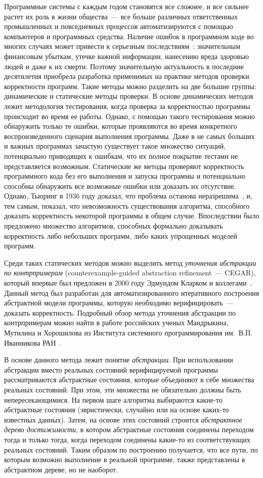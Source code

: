 Программные системы с каждым годом становятся все сложнее, и все сильнее растет их роль в жизни общества~--- все больше различных ответственных промышленных и повседневных процессов автоматизируются с помощью компьютеров и программных средства.
Наличие ошибок в программном коде во многих случаях может привести к серьезным последствиям~\cite{DBLP:journals/ieeesp/ZhivichC09}: значительным финансовым убыткам, утечке важной информации, нанесению вреда здоровью людей и даже к их смерти.
Поэтому значительную актуальность в последние десятилетия приобрела разработка применимых на практике методов проверки корректности программ.
Такие методы можно разделить на две большие группы: динамические и статические методы проверки.
В основе динамических методов лежит методология тестирования, когда проверка за корректностью программы происходит во время ее работы.
Однако, с помощью такого тестирования можно обнаружить только те ошибки, которые проявляются во время конкретного воспроизведенного сценария выполнения программы.
Даже в не самых больших и важных программах зачастую существует такое множество ситуаций, потенциально приводящих к ошибкам, что их полное покрытие тестами не представляется возможным.
Статические же методы проверяют корректность программного кода без его выполнения и запуска программы и потенциально способны обнаружить все возможные ошибки или доказать их отсутствие.
Однако, Тьюринг в 1936 году доказал, что проблема останова неразрешима~\cite{turing1936computable}, и, тем самым, показал, что невозможность существования алгоритма, способного доказать корректность некоторой программы в общем случае.
Впоследствии было предложено множество алгоритмов, способных формально доказывать корректность либо небольших программ, либо каких упрощенных моделей программ.

Среди таких статических методов можно выделить метод \emph{уточнения абстракции по контрпримерам} (counterexample-guided abstraction refinement~--- CEGAR), который впервые был предложен в 2000 году Эдмундом Кларком и коллегами~\cite{DBLP:conf/cav/ClarkeGJLV00}.
Данный метод был разработан для автоматизированного итеративного построения абстрактной модели программы, которую необходимо верифицировать~--- доказать корректность.
Подробный обзор метода уточнения абстракции по контрпримерам можно найти в работе российских ученых Мандрыкина, Мутилина и Хорошилова из Института системного программирования им.~В.П. Иванникова РАН~\cite{мандрыкин2013введение}.

В основе данного метода лежит понятие \emph{абстракции}.
При использовании абстракции вместо реальных состояний верифицируемой программы рассматриваются абстрактные состояния, которые объединяют в себе множества реальных состояний.
При этом, эти множества не обязательно должны быть непересекающимися.
На первом шаге алгоритма выбираются какие-то абстрактные состояния (эвристически, случайно или на основе каких-то известных данных).
Затем, на основе этих состояний строится \emph{абстрактное дерево достижимости}, в котором абстрактные состояния соединены переходом тогда и только тогда, когда переходом соединены какие-то из соответствующих реальных состояний.
Таким образом по построению получается, что все пути, по которым возможно выполнение в реальной программе, также представлены в абстрактном дереве, но не наоборот.

